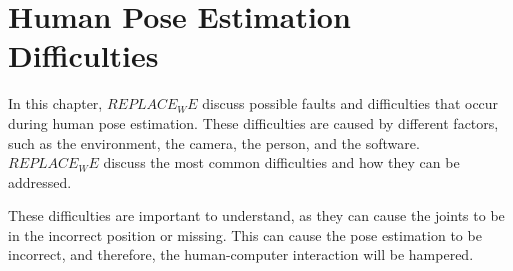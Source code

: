\chapter{Human Pose Estimation Difficulties}
\label{sec:errors}

In this chapter, $REPLACE_WE$ discuss possible faults and difficulties that occur during human pose estimation. These difficulties are caused by different factors, such as the environment, the camera, the person, and the software. $REPLACE_WE$ discuss the most common difficulties and how they can be addressed. 

These difficulties are important to understand, as they can cause the joints to be in the incorrect position or missing. This can cause the pose estimation to be incorrect, and therefore, the human-computer interaction will be hampered.



